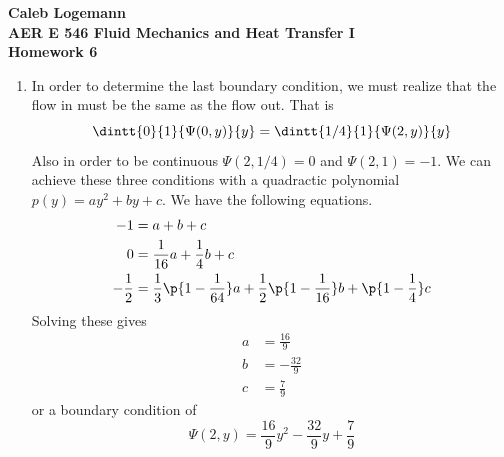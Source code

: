 \documentclass[11pt, oneside]{article}
\begin{document}
\noindent \textbf{\Large{Caleb Logemann \\
AER E 546 Fluid Mechanics and Heat Transfer I \\
Homework 6
}}

%
\begin{enumerate}
  \item %
    In order to determine the last boundary condition, we must realize that the
    flow in must be the same as the flow out.
    That is
    \[
      \dintt{0}{1}{\Psi(0, y)}{y} = \dintt{1/4}{1}{\Psi(2, y)}{y}
    \]
    Also in order to be continuous $\Psi(2, 1/4) = 0$ and $\Psi(2, 1) = -1$.
    We can achieve these three conditions with a quadractic polynomial
    $p(y) = ay^2 + by + c$.
    We have the following equations.
    \begin{align*}
      -1 &= a + b + c \\
      0 &= \frac{1}{16} a + \frac{1}{4} b + c \\
      -\frac{1}{2} &= \frac{1}{3}\p{1 - \frac{1}{64}} a + \frac{1}{2}\p{1 - \frac{1}{16}} b + \p{1 - \frac{1}{4}} c
    \end{align*}
    Solving these gives
    \begin{align*}
      a &= \frac{16}{9} \\
      b &= -\frac{32}{9} \\
      c &= \frac{7}{9}
    \end{align*}
    or a boundary condition of
    \[
      \Psi(2, y) = \frac{16}{9}y^2 - \frac{32}{9}y + \frac{7}{9}
    \]

    


\end{enumerate}
\end{document}
